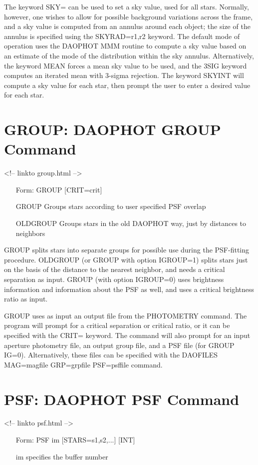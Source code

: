 The keyword SKY= can be used to set a sky value, used for all stars. Normally,
however, one wishes to allow for possible background variations across
the frame, and a sky value is computed from an annulus around each object;
the size of the annulus is specified using the SKYRAD=r1,r2 keyword.
The default mode of operation uses the DAOPHOT MMM routine to compute a
sky value based on an estimate of the mode of the distribution within the
sky annulus. Alternatively, the
keyword MEAN forces a mean sky value to be used,  and the 3SIG keyword
computes an iterated mean with 3-sigma rejection.
The keyword SKYINT will
compute a sky value for each star, then prompt the user to enter a desired 
value for each star. 

\section{GROUP: DAOPHOT GROUP Command}
\begin{rawhtml}
<!-- linkto group.html -->
\end{rawhtml}
\begin{itemize}
  \item[Form: GROUP {[CRIT=crit]}\hfill]{}
  \item[GROUP]{Groups stars according to user specified PSF overlap}
  \item[OLDGROUP]{Groups stars in the old DAOPHOT way, just by distances
to neighbors}
\end{itemize}

GROUP splits stars into separate groups for possible use during the
PSF-fitting procedure. OLDGROUP (or GROUP with option IGROUP=1) splits
stars just on the basis of the distance to the nearest neighbor, and
needs a critical separation as input. GROUP
(with option IGROUP=0) uses brightness information and information about
the PSF as well, and uses a critical brightness ratio as input.

GROUP uses as input an output file from
the PHOTOMETRY command. The program will prompt for a critical separation or
critical ratio, or it can be specified with the CRIT= keyword.  The command will
also prompt for an input aperture photometry file, an output group file,
and a PSF file (for GROUP IG=0).  Alternatively, these files can
be specified with the DAOFILES MAG=magfile GRP=grpfile PSF=psffile command.

\section{PSF: DAOPHOT PSF Command}
\begin{rawhtml}
<!-- linkto psf.html -->
\end{rawhtml}
\begin{itemize}
  \item[Form: PSF im {[STARS=s1,s2,...]} {[INT]}\hfill]{}
  \item[im]{specifies the buffer number}
\end{itemize}


